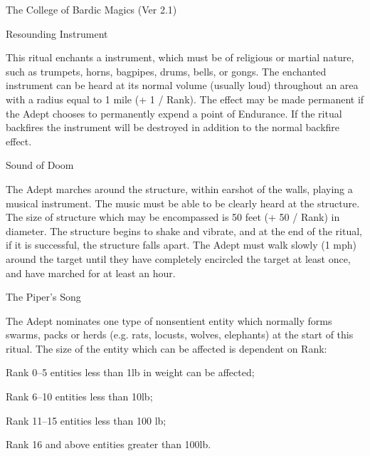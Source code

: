 \begin{Chapter}{The College of Bardic Magics (Ver 2.1)}
\begin{ritual}[R-2]{Resounding Instrument}

\begin{effects}
This ritual enchants a instrument, which must be of religious or
martial nature, such as trumpets, horns, bagpipes, drums, bells, or
gongs.  The enchanted instrument can be heard at its normal volume
(usually loud) throughout an area with a radius equal to 1 mile (+ 1 /
Rank).  The effect may be made permanent if the Adept chooses to
permanently expend a point of Endurance.  If the ritual backfires the
instrument will be destroyed in addition to the normal backfire
effect.
\end{effects}
\end{ritual}

\begin{ritual}[R-3]{Sound of Doom}

\begin{effects}
The Adept marches around the structure, within earshot of the walls,
playing a musical instrument.  The music must be able to be clearly
heard at the structure.  The size of structure which may be
encompassed is 50 feet (+ 50 / Rank) in diameter.  The structure
begins to shake and vibrate, and at the end of the ritual, if it is
successful, the structure falls apart.  The Adept must walk slowly (1
mph) around the target until they have completely encircled the target
at least once, and have marched for at least an hour.
\end{effects}
\end{ritual}

\begin{ritual}[R-4]{The Piper’s Song}

\begin{effects}
The Adept nominates one type of nonsentient entity which normally
forms swarms, packs or herds (e.g.  rats, locusts, wolves, elephants)
at the start of this ritual.  The size of the entity which can be
affected is dependent on Rank:
\begin{Description}
\item[Rank 0--5] entities less than 1lb in weight can be affected;
\item[Rank 6--10] entities less than 10lb;
\item[Rank 11--15] entities less than 100 lb;
\item[Rank 16 and above] entities greater than 100lb.
\end{Description}


\end{effects}
\end{ritual}
\end{Chapter}
